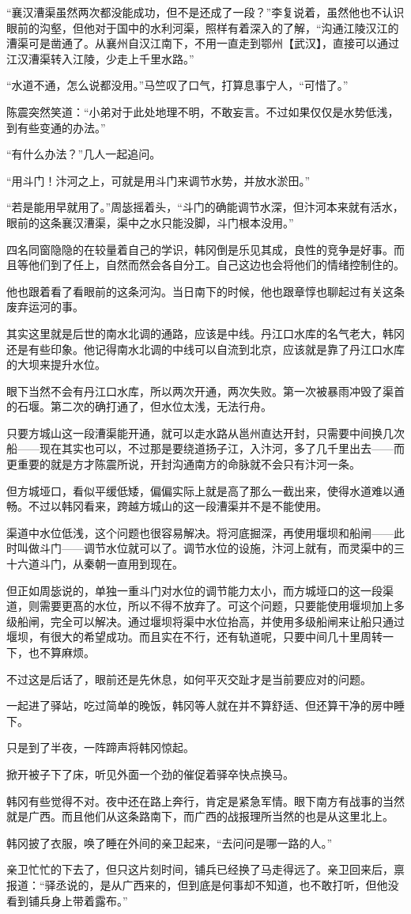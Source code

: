 “襄汉漕渠虽然两次都没能成功，但不是还成了一段？”李复说着，虽然他也不认识眼前的沟壑，但他对于国中的水利河渠，照样有着深入的了解，“沟通江陵汉江的漕渠可是凿通了。从襄州自汉江南下，不用一直走到鄂州【武汉】，直接可以通过江汉漕渠转入江陵，少走上千里水路。”

“水道不通，怎么说都没用。”马竺叹了口气，打算息事宁人，“可惜了。”

陈震突然笑道：“小弟对于此处地理不明，不敢妄言。不过如果仅仅是水势低浅，到有些变通的办法。”

“有什么办法？”几人一起追问。

“用斗门！汴河之上，可就是用斗门来调节水势，并放水淤田。”

“若是能用早就用了。”周毖摇着头，“斗门的确能调节水深，但汴河本来就有活水，眼前的这条襄汉漕渠，渠中之水只能没脚，斗门根本没用。”

四名同窗隐隐的在较量着自己的学识，韩冈倒是乐见其成，良性的竞争是好事。而且等他们到了任上，自然而然会各自分工。自己这边也会将他们的情绪控制住的。

他也跟着看了看眼前的这条河沟。当日南下的时候，他也跟章惇也聊起过有关这条废弃运河的事。

其实这里就是后世的南水北调的通路，应该是中线。丹江口水库的名气老大，韩冈还是有些印象。他记得南水北调的中线可以自流到北京，应该就是靠了丹江口水库的大坝来提升水位。

眼下当然不会有丹江口水库，所以两次开通，两次失败。第一次被暴雨冲毁了渠首的石堰。第二次的确打通了，但水位太浅，无法行舟。

只要方城山这一段漕渠能开通，就可以走水路从邕州直达开封，只需要中间换几次船——现在其实也可以，不过那是要绕道扬子江，入汴河，多了几千里出去——而更重要的就是方才陈震所说，开封沟通南方的命脉就不会只有汴河一条。

但方城垭口，看似平缓低矮，偏偏实际上就是高了那么一截出来，使得水道难以通畅。不过以韩冈看来，跨越方城山的这一段漕渠并不是不能使用。

渠道中水位低浅，这个问题也很容易解决。将河底掘深，再使用堰坝和船闸——此时叫做斗门——调节水位就可以了。调节水位的设施，汴河上就有，而灵渠中的三十六道斗门，从秦朝一直用到现在。

但正如周毖说的，单独一重斗门对水位的调节能力太小，而方城垭口的这一段渠道，则需要更髙的水位，所以不得不放弃了。可这个问题，只要能使用堰坝加上多级船闸，完全可以解决。通过堰坝将渠中水位抬高，并使用多级船闸来让船只通过堰坝，有很大的希望成功。而且实在不行，还有轨道呢，只要中间几十里周转一下，也不算麻烦。

不过这是后话了，眼前还是先休息，如何平灭交趾才是当前要应对的问题。

一起进了驿站，吃过简单的晚饭，韩冈等人就在并不算舒适、但还算干净的房中睡下。

只是到了半夜，一阵蹄声将韩冈惊起。

掀开被子下了床，听见外面一个劲的催促着驿卒快点换马。

韩冈有些觉得不对。夜中还在路上奔行，肯定是紧急军情。眼下南方有战事的当然就是广西。而且他们从这条路南下，而广西的战报理所当然的也是从这里北上。

韩冈披了衣服，唤了睡在外间的亲卫起来，“去问问是哪一路的人。”

亲卫忙忙的下去了，但只这片刻时间，铺兵已经换了马走得远了。亲卫回来后，禀报道：“驿丞说的，是从广西来的，但到底是何事却不知道，也不敢打听，但他没看到铺兵身上带着露布。”

